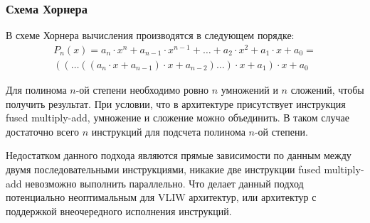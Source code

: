 \subsubsection{Схема Хорнера}

В схеме Хорнера вычисления производятся в следующем порядке:
\begin{multline}
    P_{n}(x) = a_{n} \cdot x^n + a_{n-1} \cdot x^{n-1} + \ldots +
    a_2 \cdot x^2 + a_1 \cdot x + a_0 = \\
    (( \ldots ((a_{n} \cdot x + a_{n-1}) \cdot x + a_{n-2}) \ldots ) \cdot x + a_{1}) \cdot x + a_{0}
\end{multline}

Для полинома $n$-ой степени необходимо ровно $n$ умножений и $n$ сложений, чтобы получить результат.
При условии, что в архитектуре присутствует инструкция \foreignlanguage{english}{fused multiply-add}, умножение и сложение можно объединить. В таком случае достаточно всего $n$ инструкций для подсчета полинома $n$-ой степени.

Недостатком данного подхода являются прямые зависимости по данным между двумя последовательными инструкциями, никакие две инструкции \foreignlanguage{english}{fused multiply-add} невозможно выполнить параллельно.
Что делает данный подход потенциально неоптимальным для VLIW архитектур, или архитектур с поддержкой внеочередного исполнения инструкций.

